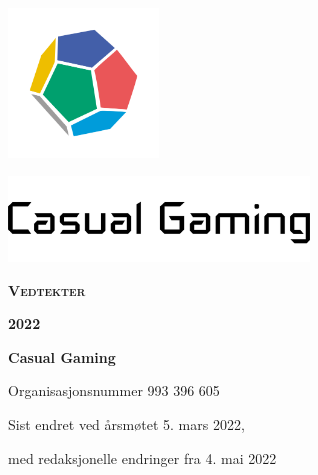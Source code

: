 \begin{titlepage}
    \centering
    \vspace*{1cm}
    \includegraphics[width=4cm]{innhold/logo-terning.png}\par
    \includegraphics[width=8cm]{innhold/logo-tekst.png}\par
    \vspace*{4cm}
    {\rmfamily\Huge\bfseries\scshape Vedtekter}\par
    \vspace*{0.5cm}
    {\rmfamily\LARGE\bfseries\scshape 2022}\par
    \vfill
    {\bfseries Casual Gaming}\par
    \vspace*{0.5cm}
    {Organisasjonsnummer 993 396 605}\par
    \vspace*{0.5cm}
    {Sist endret ved årsmøtet 5. mars 2022,}\par
    \vspace*{0.5cm}
    {med redaksjonelle endringer fra 4. mai 2022}\par
\end{titlepage}
